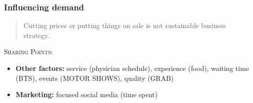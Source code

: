 \documentclass[10pt,handout,notes=show]{beamer}
\begin{document}
\begin{frame}
  \frametitle{Influencing demand}

  \begin{quotation}
    Cutting prices or putting things on sale is not sustainable business strategy.
  \end{quotation}


  \textsc{Sharing Points:}
  \begin{itemize}
    \item \textbf{Other factors:} service  (physician schedule), experience (food), waiting time (BTS), events (MOTOR SHOWS), quality (GRAB)
    \item \textbf{Marketing:} focused social media (time spent)
  \end{itemize}

\end{frame}


\end{document}
